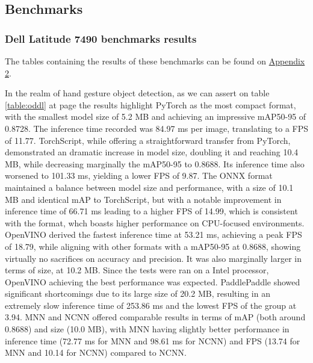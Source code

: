 \documentclass[12pt]{article}
\begin{document}
\subsection{Benchmarks}

\subsubsection{Dell Latitude 7490 benchmarks results}

The tables containing the results of these benchmarks can be found on \hyperref[sec:benchmark]{Appendix 2}.

In the realm of hand gesture object detection, as we can assert on table \ref{table:oddl} at page \pageref{table:oddl} the results highlight PyTorch as the most compact format, with the smallest model size of 5.2 MB and achieving an impressive mAP50-95 of 0.8728. The inference time recorded was 84.97 ms per image, translating to a FPS of 11.77.
TorchScript, while offering a straightforward transfer from PyTorch, demonstrated an dramatic increase in model size, doubling it and reaching 10.4 MB, while decreasing marginally the mAP50-95 to 0.8688. Its inference time also worsened to 101.33 ms, yielding a lower FPS of 9.87. 
The ONNX format maintained a balance between model size and performance, with a size of 10.1 MB and identical mAP to TorchScript, but with a notable improvement in inference time of 66.71 ms leading to a higher FPS of 14.99, which is consistent with the format, whch boasts higher performance on CPU-focused environments.
OpenVINO derived the fastest inference time at 53.21 ms, achieving a peak FPS of 18.79, while aligning with other formats with a mAP50-95 at 0.8688, showing virtually no sacrifices on accuracy and precision. It was also marginally larger in terms of size, at 10.2 MB. Since the tests were ran on a Intel processor, OpenVINO achieving the best performance was expected.
PaddlePaddle showed significant shortcomings due to its large size of 20.2 MB, resulting in an extremely slow inference time of 253.86 ms and the lowest FPS of the group at 3.94.
MNN and NCNN offered comparable results in terms of mAP (both around 0.8688) and size (10.0 MB), with MNN having slightly better performance in inference time (72.77 ms for MNN and 98.61 ms for NCNN) and FPS (13.74 for MNN and 10.14 for NCNN) compared to NCNN.
\end{document}
